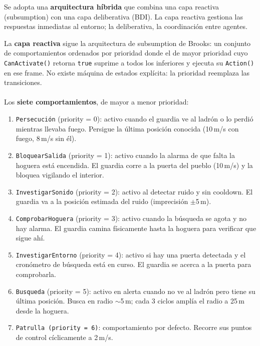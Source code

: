 \documentclass[a4paper,12pt]{article}
\begin{document}
Se adopta una \textbf{arquitectura híbrida} que combina una capa reactiva (subsumption) con una capa deliberativa (BDI). La capa reactiva gestiona las respuestas inmediatas al entorno; la deliberativa, la coordinación entre agentes.

La \textbf{capa reactiva} sigue la arquitectura de subsumption de Brooks: un conjunto de comportamientos ordenados por prioridad donde el de mayor prioridad cuyo \texttt{CanActivate()} retorna \texttt{true} suprime a todos los inferiores y ejecuta su \texttt{Action()} en ese frame. No existe máquina de estados explícita: la prioridad reemplaza las transiciones.
\\\\Los \textbf{siete comportamientos}, de mayor a menor prioridad:
    \begin{enumerate}
        \item \texttt{Persecución} (priority = 0): activo cuando el guardia ve al ladrón o lo
        perdió mientras llevaba fuego. Persigue la última posición conocida
        (10\,m/s con fuego, 8\,m/s sin él).
        \item \texttt{BloquearSalida} (priority = 1): activo cuando la alarma de que falta la hoguera está
        encendida. El guardia corre a la puerta del pueblo (10\,m/s) y la
        bloquea vigilando el interior.
        
        
        \item \texttt{InvestigarSonido} (priority = 2): activo al detectar ruido y sin
        cooldown. El guardia va a la posición estimada del ruido (imprecisión
        $\pm$5\,m).
        \item \texttt{ComprobarHoguera} (priority = 3): activo cuando la búsqueda se agota y
        no hay alarma. El guardia camina físicamente hasta la hoguera para
        verificar que sigue ahí.
        \item \texttt{InvestigarEntorno} (priority = 4): activo si hay una puerta detectada y
        el cronómetro de búsqueda está en curso. El guardia se acerca a la
        puerta para comprobarla.
        
        \item \texttt{Busqueda} (priority = 5): activo en alerta cuando no ve al ladrón pero
        tiene su última posición. Busca en radio $\sim$5\,m; cada 3 ciclos
        amplía el radio a 25\,m desde la hoguera.
        \item \texttt{Patrulla (priority = 6)}: comportamiento por defecto. Recorre sus puntos
        de control cíclicamente a 2\,m/s.
    \end{enumerate}
\end{document}
